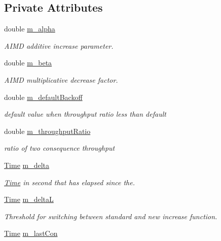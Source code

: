 \subsection*{Private Attributes}
\begin{DoxyCompactItemize}
\item 
double \hyperlink{classns3_1_1TcpHtcp_a5cc68a58825c8ed19b2666da91e7e4d0}{m\+\_\+alpha}
\begin{DoxyCompactList}\small\item\em A\+I\+MD additive increase parameter. \end{DoxyCompactList}\item 
double \hyperlink{classns3_1_1TcpHtcp_a76d41b0e13e42f6aa9b98a4a0cb06400}{m\+\_\+beta}
\begin{DoxyCompactList}\small\item\em A\+I\+MD multiplicative decrease factor. \end{DoxyCompactList}\item 
double \hyperlink{classns3_1_1TcpHtcp_a1aa22561875c042fe0bd39ca66544587}{m\+\_\+default\+Backoff}
\begin{DoxyCompactList}\small\item\em default value when throughput ratio less than default \end{DoxyCompactList}\item 
double \hyperlink{classns3_1_1TcpHtcp_a3ff9db9a1e69710b1e14516d55dc0357}{m\+\_\+throughput\+Ratio}
\begin{DoxyCompactList}\small\item\em ratio of two consequence throughput \end{DoxyCompactList}\item 
\hyperlink{classns3_1_1Time}{Time} \hyperlink{classns3_1_1TcpHtcp_a4642b12b72c7388148dd364d9117a129}{m\+\_\+delta}
\begin{DoxyCompactList}\small\item\em \hyperlink{classns3_1_1Time}{Time} in second that has elapsed since the. \end{DoxyCompactList}\item 
\hyperlink{classns3_1_1Time}{Time} \hyperlink{classns3_1_1TcpHtcp_a7e13ad28ae35566e894b5e7ae279dae5}{m\+\_\+deltaL}
\begin{DoxyCompactList}\small\item\em Threshold for switching between standard and new increase function. \end{DoxyCompactList}\item 
\hyperlink{classns3_1_1Time}{Time} \hyperlink{classns3_1_1TcpHtcp_a108362f874fef6c8a2ecb3941c74e340}{m\+\_\+last\+Con}

\end{DoxyCompactItemize}
